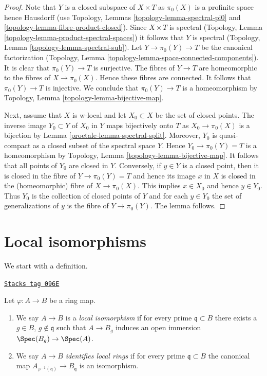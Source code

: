 \begin{proof}

Note that $Y$ is a closed subspace of $X \times T$ as $\pi_0(X)$
is a profinite space hence Hausdorff
(use Topology, Lemmas \ref{topology-lemma-spectral-pi0} and
\ref{topology-lemma-fibre-product-closed}).
Since $X \times T$ is spectral
(Topology, Lemma \ref{topology-lemma-product-spectral-spaces})
it follows that $Y$ is spectral
(Topology, Lemma \ref{topology-lemma-spectral-sub}).
Let $Y \to \pi_0(Y) \to T$ be the canonical factorization
(Topology, Lemma \ref{topology-lemma-space-connected-components}).
It is clear that $\pi_0(Y) \to T$ is surjective.
The fibres of $Y \to T$ are homeomorphic to the fibres of
$X \to \pi_0(X)$. Hence these fibres are connected. It follows
that $\pi_0(Y) \to T$ is injective. We conclude that $\pi_0(Y) \to T$
is a homeomorphism by
Topology, Lemma \ref{topology-lemma-bijective-map}.

\medskip\noindent
Next, assume that $X$ is w-local and let $X_0 \subset X$ be the
set of closed points. The inverse image $Y_0 \subset Y$ of $X_0$ in
$Y$ maps bijectively onto $T$ as $X_0 \to \pi_0(X)$ is a bijection
by Lemma \ref{proetale-lemma-spectral-split}. Moreover, $Y_0$ is quasi-compact
as a closed subset of the spectral space $Y$. Hence
$Y_0 \to \pi_0(Y) = T$ is a homeomorphism by
Topology, Lemma \ref{topology-lemma-bijective-map}.
It follows that all points of $Y_0$ are closed in $Y$.
Conversely, if $y \in Y$ is a closed point, then
it is closed in the fibre of $Y \to \pi_0(Y) = T$
and hence its image $x$ in $X$ is closed in the (homeomorphic) fibre of
$X \to \pi_0(X)$. This implies $x \in X_0$ and hence $y \in Y_0$.
Thus $Y_0$ is the collection of closed points of $Y$
and for each $y \in Y_0$ the set of generalizations of $y$ is
the fibre of $Y \to \pi_0(Y)$. The lemma follows.
\end{proof}

\section{Local isomorphisms}
\label{proetale-section-local-isomorphism}
We start with a definition.

\begin{definition}
\label{proetale-definition-local-isomorphism}
\href{https://stacks.math.columbia.edu/tag/096E}{\texttt{Stacks tag 096E}}

Let $\varphi : A \to B$ be a ring map.
\begin{enumerate}
\item We say $A \to B$ is a {\it local isomorphism} if for every prime
$\mathfrak q \subset B$ there exists a $g \in B$, $g \not \in \mathfrak q$
such that $A \to B_g$ induces an open immersion $\Spec(B_g) \to \Spec(A)$.
\item We say $A \to B$ {\it identifies local rings} if for every prime
$\mathfrak q \subset B$ the canonical map
$A_{\varphi^{-1}(\mathfrak q)} \to B_\mathfrak q$ is an isomorphism.
\end{enumerate}
\end{definition}

